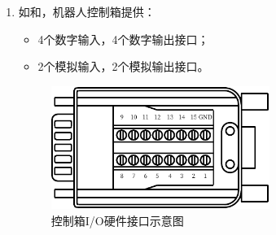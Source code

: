 \begin{enumerate}
    \item 如和，机器人控制箱提供：
    \begin{itemize}
        \item 4个数字输入，4个数字输出接口；
        \item 2个模拟输入，2个模拟输出接口。
    \end{itemize}

\begin{figure}[ht]
    \centering
    \includegraphics[height=4cm]{line_graphs/robot_box_io_plugin.pdf}
    \caption{控制箱I/O硬件接口示意图}
    \label{fig:控制箱IO}
\end{figure}


\end{enumerate}
